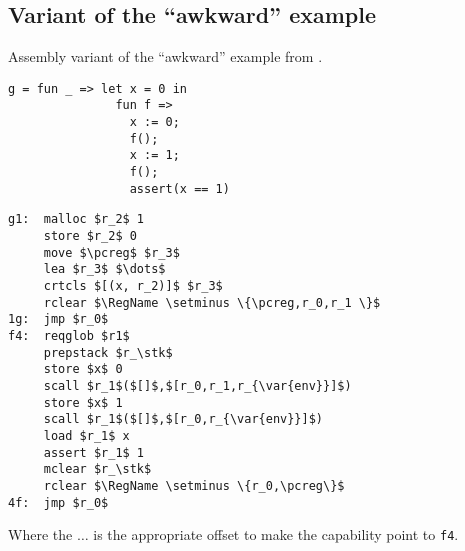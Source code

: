 \documentclass[a4paper]{article}
\newcommand{\var}[1]{\mathit{#1}}
\newcommand{\pcreg}{\mathrm{pc}}
\newcommand{\stk}{\var{stk}}
\newcommand{\plaindom}[1]{\mathrm{#1}}
\newcommand{\RegName}{\plaindom{RegisterName}}
\begin{document}
\subsection{Variant of the ``awkward'' example}
Assembly variant of the ``awkward'' example from \citep[p.~11]{Dreyer:2010:IHS:1863543.1863566}. 
\begin{verbatim}
g = fun _ => let x = 0 in
               fun f =>
                 x := 0;
                 f();
                 x := 1;
                 f();
                 assert(x == 1)
\end{verbatim}
\begin{lstlisting}
g1:  malloc $r_2$ 1
     store $r_2$ 0
     move $\pcreg$ $r_3$
     lea $r_3$ $\dots$
     crtcls $[(x, r_2)]$ $r_3$
     rclear $\RegName \setminus \{\pcreg,r_0,r_1 \}$
1g:  jmp $r_0$
f4:  reqglob $r1$
     prepstack $r_\stk$
     store $x$ 0
     scall $r_1$($[]$,$[r_0,r_1,r_{\var{env}}]$)
     store $x$ 1
     scall $r_1$($[]$,$[r_0,r_{\var{env}}]$)
     load $r_1$ x
     assert $r_1$ 1
     mclear $r_\stk$
     rclear $\RegName \setminus \{r_0,\pcreg\}$
4f:  jmp $r_0$
\end{lstlisting}
Where the $\dots$ is the appropriate offset to make the capability point to \texttt{f4}.
\end{document}
